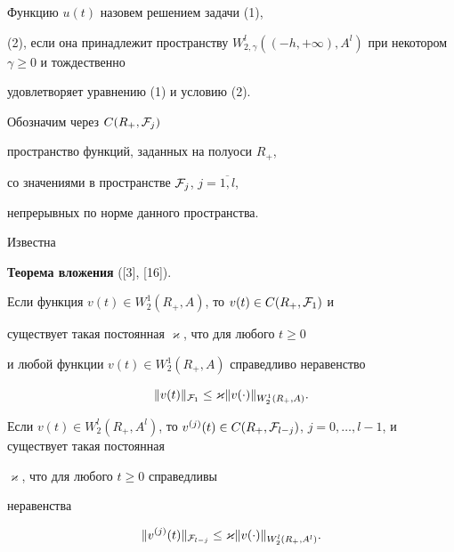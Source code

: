 \begin{defnnonum}


Функцию $u(t)$ назовем решением задачи (1),


(2), если она принадлежит пространству $W^l_{2,\gamma


}((-h,+\infty ),A^l)$ при некотором $\gamma \geq 0$ и тождественно


удовлетворяет уравнению (1) и условию (2).


\end{defnnonum}





Обозначим через $C(R_+,{\cal F}_j)$ 


пространство функций, заданных на полуоси $R_+$,


со значениями в пространстве ${\cal F}_j$, $j=\overline{1,l}$,


непрерывных по норме данного пространства.





Известна


\medskip





{\bf Теорема вложения} ([3], [16]). {\it


Если функция $v(t)\in W^1_2(R_+,A)$, то $v(t)\in C(R_+,{\cal F}_{1})$ и


существует такая постоянная $\varkappa $, что для любого $t\geq 0$


и любой функции $v(t)\in W^1_2(R_+,A)$ справедливо неравенство


$$


\| v(t)\|_{\pF_{1}}\leq \varkappa \|


v(\cdot )\|_{W^1_2(R_+,A)}.


$$


}





\begin{cornonum}


Если $v(t)\in W^l_2(R_+,A^{l})$, то $v^{(j)}(t)\in


C(R_+,\pF_{l-j})$, $j=0,\dotsc,l-1$, и существует такая постоянная


$\varkappa $, что для любого $t\geq 0$ справедливы


неравенства


$$


\| v^{(j)}(t)\|_{\pF_{l-j}}\leq \varkappa \| v(\cdot


)\|_{W^l_2(R_+,A^{l})}.


$$


\end{cornonum}





